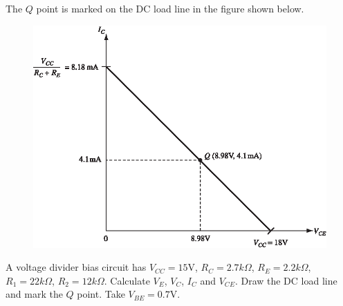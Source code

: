\begin{solution}
The $Q$ point is marked on the DC load line in the figure shown below.
\begin{figure}[H]
\centering
\includegraphics{chap3/S3-EE-03-IN025.eps}
\end{figure}
\vskip -1cm
\end{solution}

\eject

\begin{example}\label{exam4.15}
A voltage divider bias circuit has $V_{CC}=15\text{V}$, $R_{C}=2.7 k\Omega$, $R_{E}=2.2 k\Omega$, $R_{1}=22 k\Omega$, $R_{2}=12 k\Omega$. Calculate $V_{E}$, $V_{C}$, $I_{C}$ and $V_{CE}$. Draw the DC load line and mark the $Q$ point. Take $V_{BE}=0.7\text{V}$.
\end{example}

